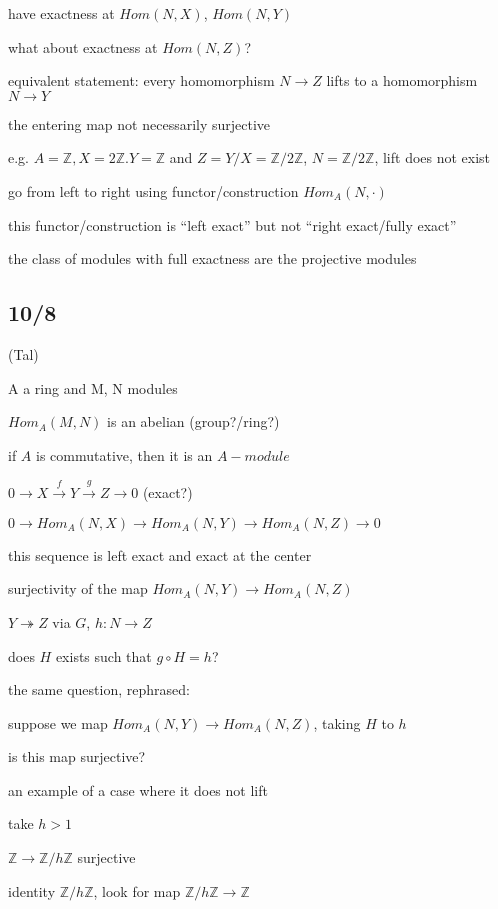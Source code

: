 \documentclass[12pt]{article}
\begin{document}
have exactness at $Hom(N, X)$, $Hom(N, Y)$

what about exactness at $Hom(N, Z)$?

equivalent statement: every homomorphism $N \to Z$ lifts to a homomorphism $N \to Y$

the entering map not necessarily surjective

e.g. $A = \mathds{Z}, X = 2\mathds{Z}. Y = \mathds{Z}$ and $Z = Y/X = \mathds{Z}/2\mathds{Z}$, $N = \mathds{Z}/2\mathds{Z}$, lift does not exist

go from left to right using functor/construction $Hom_A(N, \cdot)$

this functor/construction is ``left exact'' but not ``right exact/fully exact''

the class of modules with full exactness are the projective modules

\subsection{10/8}

\noindent
(Tal)

\noindent
A a ring and M, N modules

$Hom_A(M, N)$ is an abelian (group?/ring?)

if $A$ is commutative, then it is an $A-module$

\noindent
$0 \to X \xrightarrow{f} Y \xrightarrow{g} Z \to 0$ (exact?)

$0 \to Hom_A(N, X) \to Hom_A(N, Y) \to Hom_A(N, Z) \to 0$ 

this sequence is left exact and exact at the center

\noindent
surjectivity of the map $Hom_A(N, Y) \to Hom_A(N, Z)$

$Y \twoheadrightarrow Z$ via $G$, $h: N \to Z$

does $H$ exists such that $g \circ H = h$?

the same question, rephrased:

suppose we map $Hom_A(N, Y) \to Hom_A(N, Z)$, taking $H$ to $h$

is this map surjective?

\noindent
an example of a case where it does not lift

take $h > 1$

$\mathds{Z} \to \mathds{Z}/h\mathds{Z}$ surjective

identity $\mathds{Z}/h\mathds{Z}$, look for map $\mathds{Z}/h\mathds{Z} \to \mathds{Z}$
\end{document}
